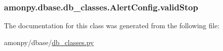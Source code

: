 \hypertarget{classamonpy_1_1dbase_1_1db__classes_1_1_alert_config_af8bb43caa61b4c962ea2e96dc8722461}{
\subsubsection[{valid\-Stop}]{\setlength{\rightskip}{0pt plus 5cm}amonpy.\-dbase.\-db\-\_\-classes.\-Alert\-Config.\-valid\-Stop}}\label{classamonpy_1_1dbase_1_1db__classes_1_1_alert_config_af8bb43caa61b4c962ea2e96dc8722461}


The documentation for this class was generated from the following file\-:\begin{DoxyCompactItemize}
\item 
amonpy/dbase/\hyperlink{db__classes_8py}{db\-\_\-classes.\-py}\end{DoxyCompactItemize}
